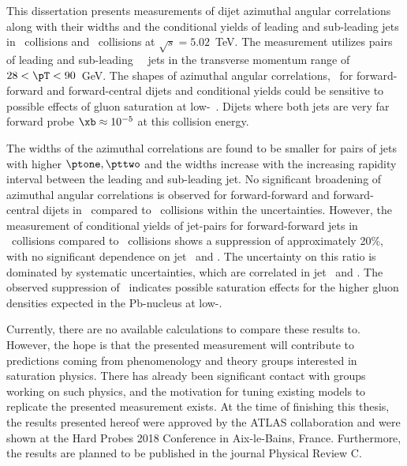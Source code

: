 This dissertation presents measurements of dijet azimuthal angular correlations along with their widths and the conditional yields of leading and sub-leading jets in \pPb\ collisions and \pp\ collisions at $\sqrt{s}=5.02$~TeV. The measurement utilizes pairs of leading and sub-leading \RFour\ \antikt\ jets in the transverse momentum range of $28 < \pT < 90$~GeV. The shapes of azimuthal angular correlations, \conetwo\, for forward-forward and forward-central dijets and conditional yields could be sensitive to possible effects of gluon saturation at low-\xb~\cite{Kutak:2013yga,Kutak:2014wga}. Dijets where both jets are very far forward probe $\xb\approx10^{-5}$ at this collision energy.

The widths of the azimuthal correlations are found to be smaller for pairs of jets with higher $\ptone, \pttwo$ and the widths increase with the increasing rapidity interval between the leading and sub-leading jet. No significant broadening of azimuthal angular correlations is observed for forward-forward and forward-central dijets in \pPb\ compared to \pp\ collisions within the uncertainties.  However, the measurement of conditional yields of jet-pairs for forward-forward jets in \pPb\ collisions compared to \pp\ collisions shows a suppression of approximately 20\%, with no significant dependence on jet \pt\ and \ystar.   The uncertainty on this ratio is dominated by systematic uncertainties, which are correlated in jet \pt\ and \ystar. The observed suppression of \ippb\ indicates possible saturation effects for the higher gluon densities expected in the Pb-nucleus at low-\xb.

Currently, there are no available calculations to compare these results to. However, the hope is that the presented measurement will contribute to predictions coming from phenomenology and theory groups interested in saturation physics. There has already been significant contact with groups working on such physics, and the motivation for tuning existing models to replicate the presented measurement exists. At the time of finishing this thesis, the results presented hereof were approved by the ATLAS collaboration and were shown at the Hard Probes 2018 Conference in Aix-le-Bains, France. Furthermore, the results are planned to be published in the journal Physical Review C.